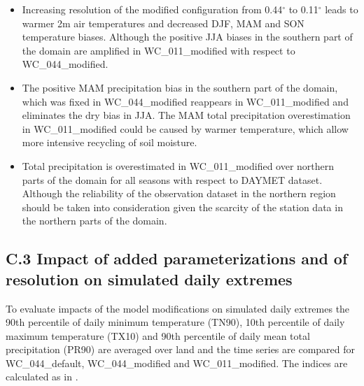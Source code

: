 \documentclass[a0b,landscape]{a0poster}
\begin{document}
\begin{multicols*}{4}
\begin{minipage}[t]{\linewidth}
\end{minipage}

\begin{itemize}
  \item Increasing resolution of the modified configuration from 0.44$^\circ$ to
        0.11$^\circ$ leads to warmer 2m air temperatures and decreased DJF, MAM and
        SON temperature biases. Although the positive JJA biases in the southern part
        of the domain are amplified in WC\_011\_modified with respect to
        WC\_044\_modified.

  \item The positive MAM precipitation bias in the southern part of the domain,
        which was fixed in WC\_044\_modified reappears in WC\_011\_modified and
        eliminates the dry bias in JJA. The MAM total precipitation overestimation in WC\_011\_modified could
        be caused by warmer temperature, which allow more intensive recycling of soil moisture.

  \item Total precipitation is overestimated in WC\_011\_modified over northern parts of
        the domain for all seasons with respect to DAYMET dataset. Although the
        reliability of the observation dataset in the northern region should be taken
        into consideration given the scarcity of the station data in the northern parts
        of the domain.
\end{itemize}


\subsection*{C.3 Impact of added parameterizations and of resolution on simulated daily extremes}

To evaluate impacts of the model modifications on simulated daily extremes the 90th percentile of
daily minimum temperature (TN90), 10th percentile of daily maximum temperature (TX10) and 90th percentile of
daily mean total precipitation (PR90) are averaged over land and the time series are compared for WC\_044\_default,
WC\_044\_modified and WC\_011\_modified. The indices are calculated as in \citet{curry2016}.


\end{multicols*}
\end{document}
